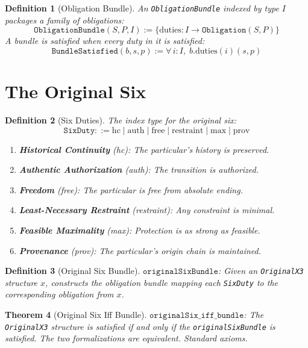 \documentclass[12pt,a4paper]{article}
\newtheorem{theorem}{Theorem}[section]
\newtheorem{definition}[theorem]{Definition}
\begin{document}
\begin{definition}[Obligation Bundle]
An \texttt{ObligationBundle} indexed by type $I$ packages a family of
obligations:
\[
\texttt{ObligationBundle}(S, P, I) := \{ \text{duties} : I \to \texttt{Obligation}(S, P) \}
\]
A bundle is satisfied when every duty in it is satisfied:
\[
\texttt{BundleSatisfied}(b, s, p) := \forall\, i : I,\; b.\text{duties}(i)(s, p)
\]
\end{definition}

\section{The Original Six}

\begin{definition}[Six Duties]
The index type for the original six:
\[
\texttt{SixDuty} ::= \text{hc} \mid \text{auth} \mid \text{free}
\mid \text{restraint} \mid \text{max} \mid \text{prov}
\]
\begin{enumerate}
    \item \textbf{Historical Continuity} (hc): The particular's history is preserved.
    \item \textbf{Authentic Authorization} (auth): The transition is authorized.
    \item \textbf{Freedom} (free): The particular is free from absolute ending.
    \item \textbf{Least-Necessary Restraint} (restraint): Any constraint is minimal.
    \item \textbf{Feasible Maximality} (max): Protection is as strong as feasible.
    \item \textbf{Provenance} (prov): The particular's origin chain is maintained.
\end{enumerate}
\end{definition}

\begin{definition}[Original Six Bundle]
$\texttt{originalSixBundle}$: Given an \texttt{OriginalX3} structure $x$,
constructs the obligation bundle mapping each \texttt{SixDuty} to the
corresponding obligation from $x$.
\end{definition}

\begin{theorem}[Original Six Iff Bundle]\label{thm:iff}
$\texttt{originalSix\_iff\_bundle}$: The \texttt{OriginalX3} structure
is satisfied if and only if the \texttt{originalSixBundle} is satisfied.
The two formalizations are equivalent. Standard axioms.
\end{theorem}
\end{document}

